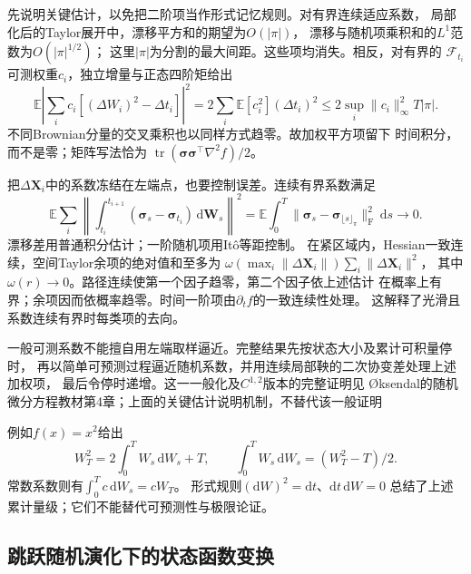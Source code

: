 先说明关键估计，以免把二阶项当作形式记忆规则。对有界连续适应系数，
局部化后的Taylor展开中，漂移平方和的期望为$O(|\pi|)$，
漂移与随机项乘积和的$L^1$范数为$O(|\pi|^{1/2})$；
这里$|\pi|$为分割的最大间距。这些项均消失。相反，对有界的
$\mathcal F_{t_i}$可测权重$c_i$，独立增量与正态四阶矩给出
\[
 \mathbb E\left|\sum_i c_i[(\Delta W_i)^2-\Delta t_i]\right|^2
   =2\sum_i\mathbb E[c_i^2](\Delta t_i)^2
   \leq2\sup_i\|c_i\|_\infty^2T|\pi|.
\]
不同Brownian分量的交叉乘积也以同样方式趋零。故加权平方项留下
时间积分，而不是零；矩阵写法恰为
$\operatorname{tr}(\bm\sigma\bm\sigma^\top\nabla^2f)/2$。

把$\Delta\bm X_i$中的系数冻结在左端点，也要控制误差。连续有界系数满足
\[
 \mathbb E\sum_i
 \left\|\int_{t_i}^{t_{i+1}}
    (\bm\sigma_s-\bm\sigma_{t_i})\,\mathrm d\bm W_s\right\|^2
 =\mathbb E\int_0^T
       \|\bm\sigma_s-\bm\sigma_{\lfloor s\rfloor_\pi}\|_{\mathrm F}^2\,\mathrm ds
 \longrightarrow0.
\]
漂移差用普通积分估计；一阶随机项用Itô等距控制。
在紧区域内，Hessian一致连续，空间Taylor余项的绝对值和至多为
$\omega(\max_i\|\Delta\bm X_i\|)\sum_i\|\Delta\bm X_i\|^2$，
其中$\omega(r)\to0$。路径连续使第一个因子趋零，第二个因子依上述估计
在概率上有界；余项因而依概率趋零。时间一阶项由$\partial_t f$的一致连续性处理。
这解释了光滑且系数连续有界时每类项的去向。

一般可测系数不能擅自用左端取样逼近。完整结果先按状态大小及累计可积量停时，
再以简单可预测过程逼近随机系数，并用连续局部鞅的二次协变差处理上述加权项，
最后令停时递增。这一一般化及$C^{1,2}$版本的完整证明见
Øksendal的随机微分方程教材第4章；上面的关键估计说明机制，不替代该一般证明

例如$f(x)=x^2$给出
\[
  W_T^2=2\int_0^T W_s\,\mathrm dW_s+T,\qquad
  \int_0^T W_s\,\mathrm dW_s=(W_T^2-T)/2.
\]
常数系数则有$\int_0^T c\,\mathrm dW_s=cW_T$。
形式规则$(\mathrm dW)^2=\mathrm dt$、$\mathrm dt\,\mathrm dW=0$
总结了上述累计量级；它们不能替代可预测性与极限论证。

\subsection{跳跃随机演化下的状态函数变换}
\label{sec:action-state-jump-ito}

